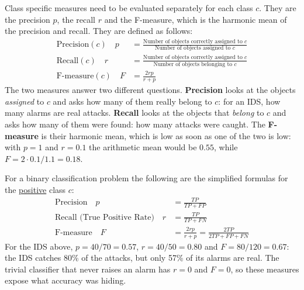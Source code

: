 Class specific measures need to be evaluated separately for each class $c$. They are the precision $p$, the recall $r$ and the F-measure, which is the harmonic mean of the precision and recall. They are defined as follows:
\begin{align*}
    \text{Precision}(c) \quad p &= \frac{\text{Number of objects correctly assigned to } c}{\text{Number of objects assigned to } c} \\[4pt]
    \text{Recall}(c) \quad r &= \frac{\text{Number of objects correctly assigned to } c}{\text{Number of objects belonging to } c} \\[4pt]
    \text{F-measure}(c) \quad F &= \frac{2rp}{r + p}
\end{align*}
The two measures answer two different questions. \textbf{Precision} looks at the objects \emph{assigned} to $c$ and asks how many of them really belong to $c$: for an IDS, how many alarms are real attacks. \textbf{Recall} looks at the objects that \emph{belong} to $c$ and asks how many of them were found: how many attacks were caught. The \textbf{F-measure} is their harmonic mean, which is low as soon as one of the two is low: with $p = 1$ and $r = 0.1$ the arithmetic mean would be $0.55$, while $F = 2 \cdot 0.1/1.1 = 0.18$.

For a binary classification problem the following are the simplified formulas for the \underline{positive} class $c$:
\begin{align*}
    \text{Precision} \quad p &= \frac{TP}{TP + FP} \\[4pt]
    \text{Recall (True Positive Rate)} \quad r &= \frac{TP}{TP + FN} \\[4pt]
    \text{F-measure} \quad F &= \frac{2rp}{r + p} = \frac{2TP}{2TP + FP + FN}
\end{align*}
For the IDS above, $p = 40/70 = 0.57$, $r = 40/50 = 0.80$ and $F = 80/120 = 0.67$: the IDS catches 80\% of the attacks, but only 57\% of its alarms are real. The trivial classifier that never raises an alarm has $r = 0$ and $F = 0$, so these measures expose what accuracy was hiding.

